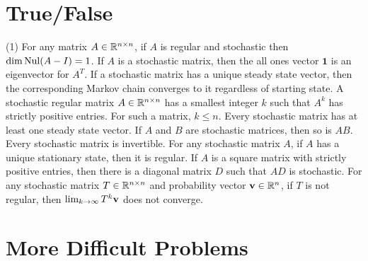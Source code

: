 \section{True/False}

\trueFalseHeader

\begin{tasks}[resume, style=enumerate](1)
\task
  For any matrix $A \in \mathbb R^{n \times n}$, if $A$ is regular and
  stochastic then $\dim \operatorname{\mathrm{Nul}} (A - I) = 1$.
\task
  If $A$ is a stochastic matrix, then the all ones vector $\mathbf 1$
  is an eigenvector for $A^T$.
\task
  If a stochastic matrix has a unique steady state vector, then the
  corresponding Markov chain converges to it regardless of starting
  state.
\task
  A stochastic regular matrix $A \in \mathbb R^{n \times n}$ has a
  smallest integer $k$ such that $A^k$ has strictly positive
  entries. For such a matrix, $k \leq n$.
\task
  Every stochastic matrix has at least one steady state vector.
\task
  If $A$ and $B$ are stochastic matrices, then so is $AB$.
\task
  Every stochastic matrix is invertible.
\task
  For any stochastic matrix $A$, if $A$ has a unique stationary state,
  then it is regular.
\task
  If $A$ is a square matrix with strictly positive entries, then there
  is a diagonal matrix $D$ such that $AD$ is stochastic.
\task
  For any stochastic matrix $T \in \mathbb R^{n \times n}$ and probability
  vector $\mathbf v \in \mathbb R^n$, if $T$ is not regular, then $\lim_{k \to
  \infty} T^k \mathbf v$ does not converge.
\end{tasks}

\section{More Difficult Problems}

